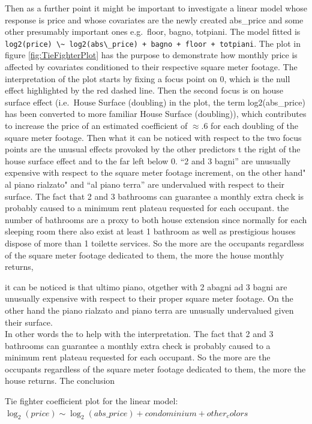 \documentclass[
  12pt,
  a4paper,
  oneside]{book}
\newcommand{\passthrough}[1]{#1}
\theoremstyle{definition}
\theoremstyle{definition}
\theoremstyle{definition}
\theoremstyle{remark}
\begin{document}
Then as a further point it might be important to investigate a linear model whose response is price and whose covariates are the newly created abs\_price and some other presumably important ones e.g.~floor, bagno, totpiani. The model fitted is \passthrough{\lstinline!log2(price) \~ log2(abs\_price) + bagno + floor + totpiani!}.
The plot in figure \ref{fig:TieFighterPlot} has the purpose to demonstrate how monthly price is affected by covariates conditioned to their respective square meter footage. The interpretation of the plot starts by fixing a focus point on 0, which is the null effect highlighted by the red dashed line. Then the second focus is on house surface effect (i.e.~House Surface (doubling) in the plot, the term log2(abs\_price) has been converted to more familiar House Surface (doubling)), which contributes to increase the price of an estimated coefficient of \(\approx .6\) for each doubling of the square meter footage. Then what it can be noticed with respect to the two focus points are the unusual effects provoked by the other predictors t the right of the house surface effect and to the far left below 0. ``2 and 3 bagni'' are unusually expensive with respect to the square meter footage increment, on the other hand" al piano rialzato" and ``al piano terra'' are undervalued with respect to their surface. The fact that 2 and 3 bathrooms can guarantee a monthly extra check is probably caused to a minimum rent plateau requested for each occupant. the number of bathrooms are a proxy to both house extension since normally for each sleeping room there also exist at least 1 bathroom as well as prestigious houses dispose of more than 1 toilette services. So the more are the occupants regardless of the square meter footage dedicated to them, the more the house monthly returns,

it can be noticed is that ultimo piano, otgether with 2 abagni ad 3 bagni are unusually expensive with respect to their proper square meter footage. On the other hand the piano rialzato and piano terra are unusually undervalued given their surface.\\
In other words the to help with the interpretation. The fact that 2 and 3 bathrooms can guarantee a monthly extra check is probably caused to a minimum rent plateau requested for each occupant. So the more are the occupants regardless of the square meter footage dedicated to them, the more the house returns. The conclusion

Tie fighter coefficient plot for the linear model: \(\log_{2}(price) \sim \log_{2}(abs\_price) + condominium + other_colors\)
\end{document}
